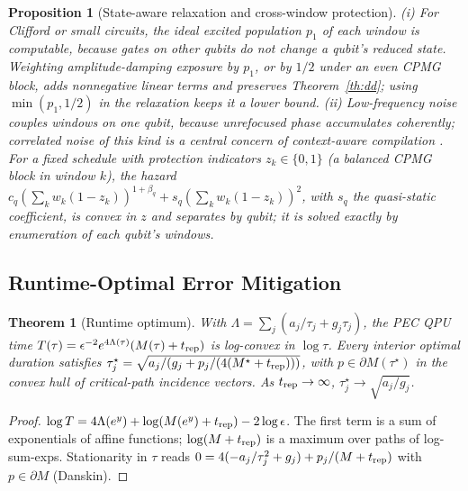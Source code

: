 \documentclass[10pt,letterpaper,journal]{IEEEtran}
\newtheorem{theorem}{Theorem}
\newtheorem{proposition}{Proposition}
\begin{document}
\begin{proposition}[State-aware relaxation and cross-window protection]\label{prop:state}
(i) For Clifford or small circuits, the ideal excited population $p_1$ of each window is computable, because gates on other qubits do not change a qubit's reduced state. Weighting amplitude-damping exposure by $p_1$, or by $1/2$ under an even CPMG block, adds nonnegative linear terms and preserves Theorem~\ref{th:dd}; using $\min(p_1,1/2)$ in the relaxation keeps it a lower bound. (ii) Low-frequency noise couples windows on one qubit, because unrefocused phase accumulates coherently; correlated noise of this kind is a central concern of context-aware compilation \cite{seif2024}. For a fixed schedule with protection indicators $z_k\in\{0,1\}$ (a balanced CPMG block in window $k$), the hazard $c_q(\sum_k w_k(1-z_k))^{1+\beta_q}+s_q(\sum_k w_k(1-z_k))^2$, with $s_q$ the quasi-static coefficient, is convex in $z$ and separates by qubit; it is solved exactly by enumeration of each qubit's windows.
\end{proposition}

\subsection{Runtime-Optimal Error Mitigation}
\begin{theorem}[Runtime optimum]\label{th:runtime}
With $\Lambda=\sum_j(a_j/\tau_j+g_j\tau_j)$, the PEC QPU time $T(\tau)=\epsilon^{-2}e^{4\Lambda(\tau)}(M(\tau)+t_{\rm rep})$ is log-convex in $\log\tau$. Every interior optimal duration satisfies $\tau_j^\star=\sqrt{a_j/(g_j+p_j/(4(M^\star+t_{\rm rep})))}$, with $p\in\partial M(\tau^\star)$ in the convex hull of critical-path incidence vectors. As $t_{\rm rep}\to\infty$, $\tau_j^\star\to\sqrt{a_j/g_j}$.
\end{theorem}
\begin{proof}
$\log T=4\Lambda(e^y)+\log(M(e^y)+t_{\rm rep})-2\log\epsilon$. The first term is a sum of exponentials of affine functions; $\log(M+t_{\rm rep})$ is a maximum over paths of log-sum-exps. Stationarity in $\tau$ reads $0=4(-a_j/\tau_j^2+g_j)+p_j/(M+t_{\rm rep})$ with $p\in\partial M$ (Danskin).
\end{proof}
\end{document}

